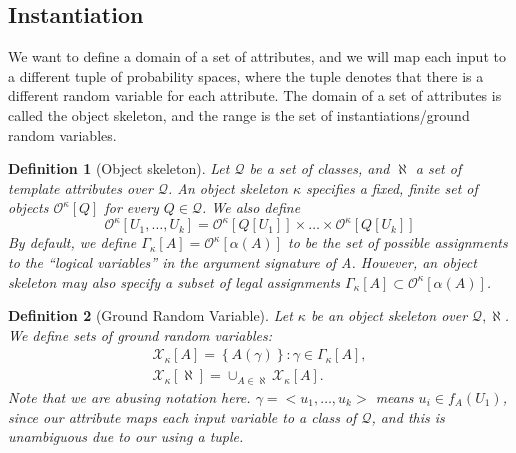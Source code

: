 \documentclass[11pt]{article}
\newtheorem{definition}{Definition}
\begin{document}
\subsection{Instantiation}
  We want to define a domain of a set of attributes, and we will map each input to a different tuple of probability spaces, where the tuple denotes that there is a different random variable for each attribute. 
  The domain of a set of attributes is called the object skeleton, and the range is the set of instantiations/ground random variables.

  \begin{definition}[Object skeleton]
    Let $\mathcal{Q}$ be a set of classes, and $\aleph$ a set of template attributes over $\mathcal{Q}$. 
    An \emph{object skeleton} $\kappa$ specifies a fixed, finite set of objects $\mathcal{O}^{ \kappa }\left[ Q \right]$ for every $Q \in \mathcal{Q}$. 
    We also define
    \begin{equation}
      \mathcal{O}^{\kappa}\left[ U_1,\ldots,U_k \right] = \mathcal{O}^{\kappa}\left[ Q\left[ U_1 \right] \right] \times \ldots \times \mathcal{O}^{\kappa}\left[ Q\left[ U_k \right] \right] 
      \label{}
    \end{equation}
    By default, we define $\Gamma_{ \kappa }\left[ A \right] = \mathcal{O}^{\kappa}\left[ \alpha(A) \right]$ to be the set of possible assignments to the ``logical variables'' in the argument signature of A. 
    However, an object skeleton may also specify a subset of legal assignments $\Gamma_{ \kappa }\left[ A \right] \subset \mathcal{O}^{\kappa}\left[ \alpha(A) \right]$.  
  \end{definition}
  
  \begin{definition}[Ground Random Variable]
    Let $\kappa$ be an object skeleton over $\mathcal{Q},\aleph$. 
    We define sets of ground random variables:
    \begin{equation}
      \begin{split}
        \mathcal{X}_{ \kappa }\left[ A \right] = \left\{ A(\gamma)  \right\} \colon \gamma \in \Gamma_{\kappa}\left[ A \right], \\
	\mathcal{X}_{ \kappa }\left[ \aleph \right] = \cup_{A \in \aleph} \mathcal{X}_{\kappa}\left[ A \right].
      \end{split}
      \label{eqn:ground random variable}
    \end{equation}
    Note that we are abusing notation here. 
    $\gamma = <u_1,\ldots, u_k>$ means $u_i \in f_A(U_1)$, since our attribute maps each input variable to a class of $\mathcal{Q}$, and this is unambiguous due to our using a tuple.
  \end{definition}
\end{document}
